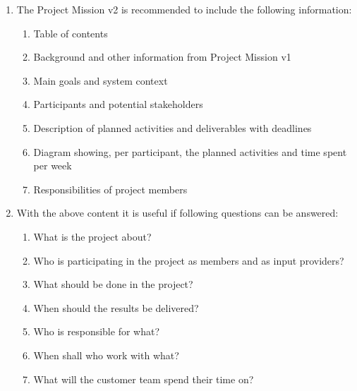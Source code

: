 \documentclass[10pt,a4paper]{article}
\begin{document}
 \begin{enumerate}
 \item The Project Mission v2 is recommended to include the following information:
\begin{enumerate}
\item Table of contents
 \item Background and other information from Project Mission v1 
 \item	Main goals and system context
 \item	Participants and potential stakeholders 
 \item	Description of planned activities and deliverables with deadlines
 \item	Diagram showing, per participant, the planned activities and time spent per week 
 \item	Responsibilities of project members 
\end{enumerate}

 \item With the above content it is useful if following questions can be answered:
 \begin{enumerate}
 \item          What is the project about?
 \item          Who is participating in the project as members and as input providers?
 \item          What should be done in the project?
 \item          When should the results be delivered?
 \item          Who is responsible for what?
 \item          When shall who work with what?
 \item		What will the customer team spend their time on? 
\end{enumerate}
\end{enumerate}

\newpage
\end{document}
